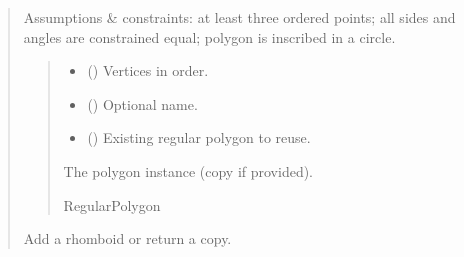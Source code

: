 \documentclass[letterpaper,10pt,english]{sphinxmanual}
\begin{document}
\begin{quote}
\begin{fulllineitems}
\begin{fulllineitems}
\sphinxAtStartPar
Assumptions \& constraints: at least three ordered points; all sides and
angles are constrained equal; polygon is inscribed in a circle.
\begin{quote}\begin{description}
\begin{itemize}
\item {} 
\sphinxAtStartPar
{} () \textendash{} Vertices in order.

\item {} 
\sphinxAtStartPar
{} (\sphinxstyleliteralemphasis{\sphinxupquote{ | }}) \textendash{} Optional name.

\item {} 
\sphinxAtStartPar
{} (\sphinxstyleliteralemphasis{\sphinxupquote{ | }}) \textendash{} Existing regular polygon to reuse.

\end{itemize}

\sphinxAtStartPar
The polygon instance (copy if provided).

\sphinxAtStartPar
RegularPolygon

\end{description}\end{quote}

\end{fulllineitems}


\begin{fulllineitems}
\label{\detokenize{pygeox:pygeox.add_objects.AddNamespace.rhomboid}}
\pysigstartsignatures
\pysiglinewithargsret
{}
{\sphinxparamcomma {}\sphinxparamcomma {}\sphinxparamcomma {}\sphinxparamcomma {}\sphinxparamcomma {}\sphinxparamcomma {}}
{}
\pysigstopsignatures
\sphinxAtStartPar
Add a rhomboid or return a copy.


\end{fulllineitems}
\end{fulllineitems}
\end{quote}
\end{document}
